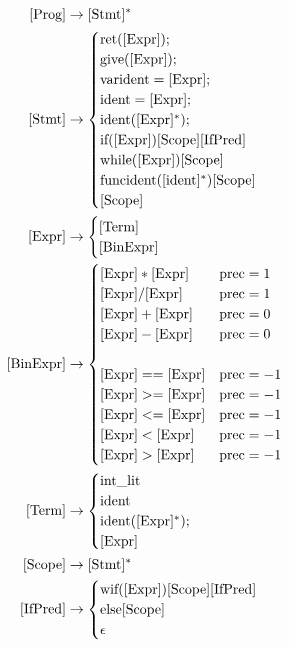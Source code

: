 $$
\begin{align}
[\text{Prog}] &\to [\text{Stmt}]^* \\
[\text{Stmt}] &\to
\begin{cases}
\text{ret}([\text{Expr}]); \\
\text{give}([\text{Expr}]); \\
\text{var}\space\text{ident} = [\text{Expr}]; \\
\text{ident} = \text{[Expr]}; \\
\text{ident}([\text{Expr}]^*); \\
\text{if} ([\text{Expr}])[\text{Scope}]\text{[IfPred]} \\
\text{while} ([\text{Expr}])[\text{Scope}] \\
\text{func}\space \text{ident}([\text{ident}]^*)[\text{Scope}]\\
[\text{Scope}]
\end{cases} \\

[\text{Expr}] &\to
\begin{cases}
[\text{Term}] \\
[\text{BinExpr}]
\end{cases} \\

[\text{BinExpr}] &\to
\begin{cases}
[\text{Expr}] * [\text{Expr}]  & \text{prec} = 1 \\
[\text{Expr}] / [\text{Expr}]  & \text{prec} = 1 \\
[\text{Expr}] + [\text{Expr}]  & \text{prec} = 0 \\
[\text{Expr}] - [\text{Expr}]  & \text{prec} = 0 \\
\\
[\text{Expr}] == [\text{Expr}]  & \text{prec} = -1 \\
[\text{Expr}] >= [\text{Expr}]  & \text{prec} = -1 \\
[\text{Expr}] <= [\text{Expr}]  & \text{prec} = -1 \\
[\text{Expr}] < [\text{Expr}]  & \text{prec} = -1 \\
[\text{Expr}] > [\text{Expr}]  & \text{prec} = -1 \\
\end{cases} \\

[\text{Term}] &\to
\begin{cases}
\text{int\_lit} \\
\text{ident} \\
\text{ident}([\text{Expr}]^*); \\
[\text{Expr}]
\end{cases} \\

[\text{Scope}] &\to [\text{Stmt}]^* \\

[\text{IfPred}] &\to
\begin{cases}
\text{wif}([\text{Expr}])[\text{Scope}][\text{IfPred}] \\
\text{else}[\text{Scope}] \\
\epsilon
\end{cases}

\end{align}
$$

